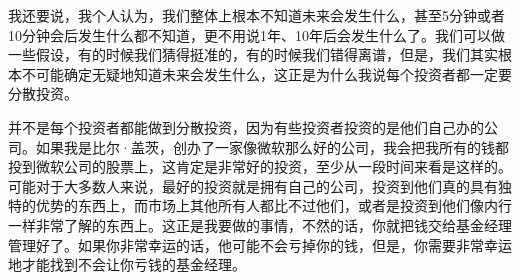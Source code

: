 我还要说，我个人认为，我们整体上根本不知道未来会发生什么，甚至5分钟或者10分钟会后发生什么都不知道，更不用说1年、10年后会发生什么了。我们可以做一些假设，有的时候我们猜得挺准的，有的时候我们错得离谱，但是，我们其实根本不可能确定无疑地知道未来会发生什么，这正是为什么我说每个投资者都一定要分散投资。

并不是每个投资者都能做到分散投资，因为有些投资者投资的是他们自己办的公司。如果我是比尔·盖茨，创办了一家像微软那么好的公司，我会把我所有的钱都投到微软公司的股票上，这肯定是非常好的投资，至少从一段时间来看是这样的。可能对于大多数人来说，最好的投资就是拥有自己的公司，投资到他们真的具有独特的优势的东西上，而市场上其他所有人都比不过他们，或者是投资到他们像内行一样非常了解的东西上。这正是我要做的事情，不然的话，你就把钱交给基金经理管理好了。如果你非常幸运的话，他可能不会亏掉你的钱，但是，你需要非常幸运地才能找到不会让你亏钱的基金经理。

